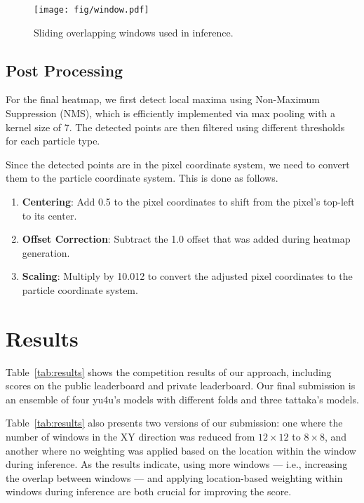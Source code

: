 \begin{figure}[tb]
    \centering
    \texttt{[image: fig/window.pdf]}
    \caption{Sliding overlapping windows used in inference.}
    \label{fig:window}
\end{figure}



\subsection{Post Processing}
For the final heatmap, we first detect local maxima using Non-Maximum Suppression (NMS), which is efficiently implemented via max pooling with a kernel size of 7. The detected points are then filtered using different thresholds for each particle type.

Since the detected points are in the pixel coordinate system, we need to convert them to the particle coordinate system.
This is done as follows.
\begin{enumerate}[label=\arabic*.]
  \item \textbf{Centering}: Add 0.5 to the pixel coordinates to shift from the pixel’s top-left to its center.
  \item \textbf{Offset Correction}: Subtract the 1.0 offset that was added during heatmap generation.
  \item \textbf{Scaling}: Multiply by 10.012 to convert the adjusted pixel coordinates to the particle coordinate system.
\end{enumerate}


\section{Results}
Table~\ref{tab:results} shows the competition results of our approach, including scores on the public leaderboard and private leaderboard.
Our final submission is an ensemble of four yu4u's models with different folds and three tattaka's models.

Table~\ref{tab:results} also presents two versions of our submission: one where the number of windows in the XY direction was reduced from $12\times12$ to $8\times8$, and another where no weighting was applied based on the location within the window during inference.  
As the results indicate, using more windows --- i.e., increasing the overlap between windows --- and applying location-based weighting within windows during inference are both crucial for improving the score.


